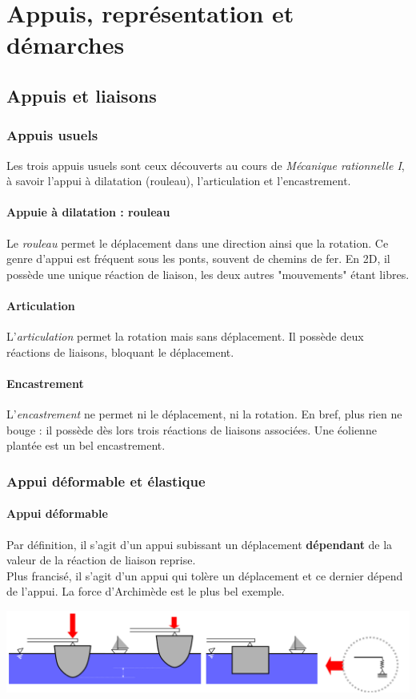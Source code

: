 \chapter{Appuis, représentation et démarches}
\section{Appuis et liaisons}
	\subsection{Appuis usuels}
	Les trois appuis usuels sont ceux découverts au cours de \textit{Mécanique 
	rationnelle I}, à savoir l'appui à dilatation (rouleau), l'articulation et 
	l'encastrement.
	
		\subsubsection{Appuie à dilatation : rouleau}
		Le \textit{rouleau} permet le déplacement dans une direction ainsi que 
		la rotation. Ce genre d'appui est fréquent sous les ponts, souvent de 
		chemins de fer. En 2D, il possède une unique réaction de liaison, les 
		deux autres "mouvements" étant libres.
		
		\subsubsection{Articulation}
		L'\textit{articulation} permet la rotation mais sans déplacement. Il 
		possède deux réactions de liaisons, bloquant le déplacement.
		
		\subsubsection{Encastrement}
		L'\textit{encastrement} ne permet ni le déplacement, ni la rotation. En 
		bref, plus rien ne bouge : il possède dès lors trois réactions de 
		liaisons associées. Une éolienne plantée est un bel encastrement.
	
	\subsection{Appui déformable et élastique}
		\subsubsection{Appui déformable}
		Par définition, il s'agit d'un appui subissant un déplacement 
		\textbf{dépendant} 	de la valeur de la réaction de liaison reprise. \\
		Plus francisé, il s'agit d'un appui qui tolère un déplacement et 
		ce dernier dépend de l'appui. La force d'Archimède est le plus bel 
		exemple.
		\begin{center}
		\includegraphics[scale=0.26]{ch2/image4}
		\end{center}\newpage
